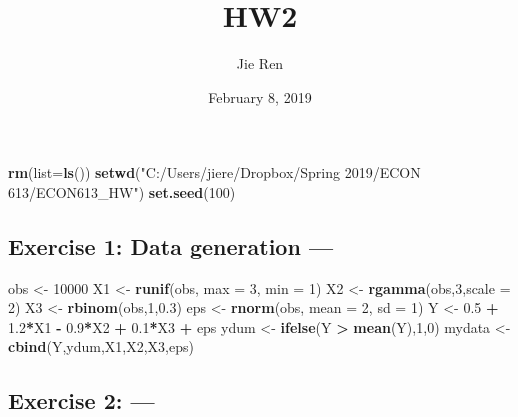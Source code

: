 \documentclass[]{article}
\title{HW2}
\author{Jie Ren}
\date{February 8, 2019}
\newenvironment{Shaded}{\begin{snugshade}}{\end{snugshade}}
\newcommand{\KeywordTok}[1]{\textcolor[rgb]{0.13,0.29,0.53}{\textbf{#1}}}
\newcommand{\DataTypeTok}[1]{\textcolor[rgb]{0.13,0.29,0.53}{#1}}
\newcommand{\DecValTok}[1]{\textcolor[rgb]{0.00,0.00,0.81}{#1}}
\newcommand{\FloatTok}[1]{\textcolor[rgb]{0.00,0.00,0.81}{#1}}
\newcommand{\StringTok}[1]{\textcolor[rgb]{0.31,0.60,0.02}{#1}}
\newcommand{\OperatorTok}[1]{\textcolor[rgb]{0.81,0.36,0.00}{\textbf{#1}}}
\newcommand{\NormalTok}[1]{#1}
\begin{document}
\maketitle

\begin{Shaded}
\begin{Highlighting}[]
\KeywordTok{rm}\NormalTok{(}\DataTypeTok{list=}\KeywordTok{ls}\NormalTok{())}
\KeywordTok{setwd}\NormalTok{(}\StringTok{"C:/Users/jiere/Dropbox/Spring 2019/ECON 613/ECON613_HW"}\NormalTok{)}
\KeywordTok{set.seed}\NormalTok{(}\DecValTok{100}\NormalTok{)}
\end{Highlighting}
\end{Shaded}

\subsection{Exercise 1: Data generation
---}\label{exercise-1-data-generation}

\begin{Shaded}
\begin{Highlighting}[]
\NormalTok{obs <-}\StringTok{ }\DecValTok{10000}
\NormalTok{X1 <-}\StringTok{ }\KeywordTok{runif}\NormalTok{(obs, }\DataTypeTok{max =} \DecValTok{3}\NormalTok{, }\DataTypeTok{min =} \DecValTok{1}\NormalTok{)}
\NormalTok{X2 <-}\StringTok{ }\KeywordTok{rgamma}\NormalTok{(obs,}\DecValTok{3}\NormalTok{,}\DataTypeTok{scale =} \DecValTok{2}\NormalTok{)}
\NormalTok{X3 <-}\StringTok{ }\KeywordTok{rbinom}\NormalTok{(obs,}\DecValTok{1}\NormalTok{,}\FloatTok{0.3}\NormalTok{)}
\NormalTok{eps <-}\StringTok{ }\KeywordTok{rnorm}\NormalTok{(obs, }\DataTypeTok{mean =} \DecValTok{2}\NormalTok{, }\DataTypeTok{sd =} \DecValTok{1}\NormalTok{)}
\NormalTok{Y <-}\StringTok{ }\FloatTok{0.5} \OperatorTok{+}\StringTok{ }\FloatTok{1.2}\OperatorTok{*}\NormalTok{X1 }\OperatorTok{-}\StringTok{ }\FloatTok{0.9}\OperatorTok{*}\NormalTok{X2 }\OperatorTok{+}\StringTok{ }\FloatTok{0.1}\OperatorTok{*}\NormalTok{X3 }\OperatorTok{+}\StringTok{ }\NormalTok{eps}
\NormalTok{ydum <-}\StringTok{ }\KeywordTok{ifelse}\NormalTok{(Y }\OperatorTok{>}\StringTok{ }\KeywordTok{mean}\NormalTok{(Y),}\DecValTok{1}\NormalTok{,}\DecValTok{0}\NormalTok{)}
\NormalTok{mydata <-}\StringTok{ }\KeywordTok{cbind}\NormalTok{(Y,ydum,X1,X2,X3,eps)}
\end{Highlighting}
\end{Shaded}

\subsection{Exercise 2: ---}\label{exercise-2}
\end{document}
